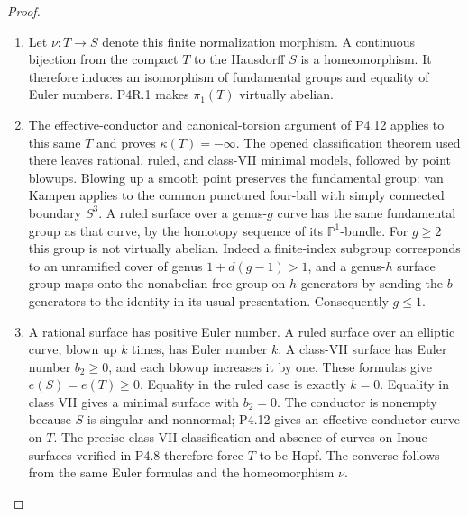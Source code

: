 \begin{proof}

\begin{enumerate}[label={$\langle1\rangle$\arabic*.},leftmargin=*]
\item Let $\nu:T\to S$ denote this finite normalization morphism.
A continuous bijection from the compact $T$ to the Hausdorff
$S$ is a homeomorphism. It therefore induces an isomorphism
of fundamental groups and equality of Euler numbers. P4R.1
makes $\pi_1(T)$ virtually abelian.

\item The effective-conductor and canonical-torsion argument of
P4.12 applies to this same $T$ and proves $\kappa(T)=-\infty$.
The opened classification theorem used there leaves rational,
ruled, and class-VII minimal models, followed by point blowups.
Blowing up a smooth point preserves the fundamental group:
van Kampen applies to the common punctured four-ball with
simply connected boundary $S^3$. A ruled surface over a
genus-$g$ curve has the same fundamental group as that curve,
by the homotopy sequence of its $\mathbb P^1$-bundle.
For $g\ge2$ this group is not virtually abelian. Indeed a
finite-index subgroup corresponds to an unramified cover
of genus $1+d(g-1)>1$, and a genus-$h$ surface group maps
onto the nonabelian free group on $h$ generators by sending
the $b$ generators to the identity in its usual presentation.
Consequently $g\le1$.

\item A rational surface has positive Euler number. A ruled surface
over an elliptic curve, blown up $k$ times, has Euler number
$k$. A class-VII surface has Euler number $b_2\ge0$, and
each blowup increases it by one. These formulas give
$e(S)=e(T)\ge0$. Equality in the ruled case is exactly
$k=0$. Equality in class VII gives a minimal surface with
$b_2=0$. The conductor is nonempty because $S$ is singular
and nonnormal; P4.12 gives an effective conductor curve on
$T$. The precise class-VII classification and absence of
curves on Inoue surfaces verified in P4.8 therefore force
$T$ to be Hopf. The converse follows from the same Euler
formulas and the homeomorphism $\nu$.

\end{enumerate}
\end{proof}
